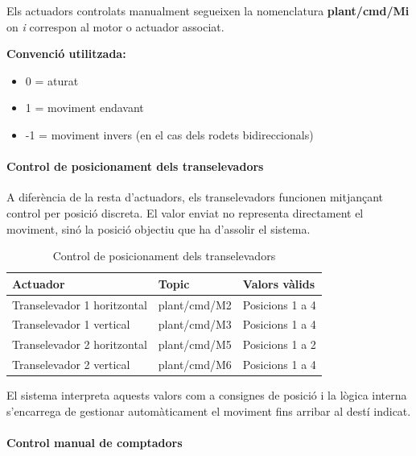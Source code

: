 \documentclass[a4paper,11pt,DIV=13,headings=normal,abstract=true,twoside=semi]{article}
\begin{document}
Els actuadors controlats manualment segueixen la nomenclatura \textbf{plant/cmd/Mi} on \textit{i} correspon al motor o actuador associat.


\textbf{Convenció utilitzada:}

\begin{itemize}
\item 0 = aturat
\item 1 = moviment endavant
\item -1 = moviment invers (en el cas dels rodets bidireccionals)
\end{itemize}

\paragraph{Control de posicionament dels transelevadors}

A diferència de la resta d'actuadors, els transelevadors funcionen mitjançant control per posició discreta. El valor enviat no representa directament el moviment, sinó la posició objectiu que ha d'assolir el sistema.

\begin{table}[H]
\centering
\small
\caption{Control de posicionament dels transelevadors}
\label{tab:mqtt_asrs}
\begin{tabular}{|p{4cm}|p{4cm}|p{5cm}|}
\hline
\textbf{Actuador} & \textbf{Topic} & \textbf{Valors vàlids} \\ \hline

Transelevador 1 horitzontal & plant/cmd/M2 & Posicions 1 a 4 \\ \hline

Transelevador 1 vertical & plant/cmd/M3 & Posicions 1 a 4 \\ \hline

Transelevador 2 horitzontal & plant/cmd/M5 & Posicions 1 a 2 \\ \hline

Transelevador 2 vertical & plant/cmd/M6 & Posicions 1 a 4 \\ \hline

\end{tabular}

\end{table}

El sistema interpreta aquests valors com a consignes de posició i la lògica interna s'encarrega de gestionar automàticament el moviment fins arribar al destí indicat.

\paragraph{Control manual de comptadors}
\end{document}
